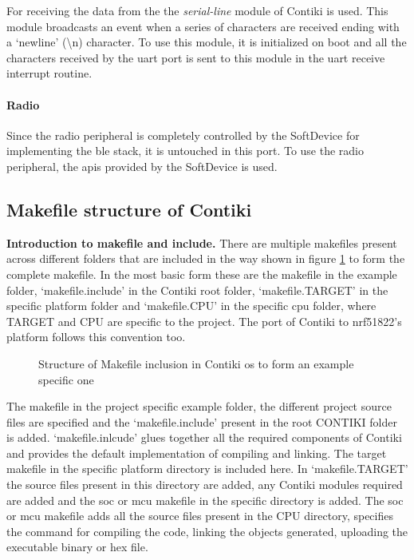 For receiving the data from the the \emph{serial-line} module of Contiki is used. This module broadcasts an event when a series of characters are received ending with a `newline' (\textbackslash n) character. To use this module, it is initialized on boot and all the characters received by the \gls{uart} port is sent to this module in the \gls{uart} receive interrupt routine.

\paragraph{Radio}
Since the radio peripheral is completely controlled by the SoftDevice for implementing the \gls{ble} stack, it is untouched in this port. To use the radio peripheral, the \glspl{api} provided by the SoftDevice is used.

\subsection{Makefile structure of Contiki}

\textbf{Introduction to makefile and include.}
There are multiple makefiles present across different folders that are included in the way shown in figure \ref{MakefileLevel} to form the complete makefile. In the most basic form these are the makefile in the example folder, `makefile.include' in the Contiki root folder, `makefile.TARGET' in the specific platform folder and `makefile.CPU' in the specific cpu folder, where TARGET and CPU are specific to the project. The port of Contiki to nrf51822's platform follows this convention too.

\begin{figure}[h]
\centering
\def\svgwidth{0.93\columnwidth}

\vspace{-10pt}
\caption{Structure of Makefile inclusion in Contiki \gls{os} to form an example specific one}
\label{MakefileLevel}
\end{figure}


The makefile in the project specific example folder, the different project source files are specified and the `makefile.include' present in the root CONTIKI folder is added. `makefile.inlcude' glues together all the required components of Contiki and provides the default implementation of compiling and linking. The target makefile in the specific platform directory is included here. In `makefile.TARGET' the source files present in this directory are added, any Contiki modules required are added and the \gls{soc} or \gls{mcu} makefile in the specific directory is added. The \gls{soc} or \gls{mcu} makefile adds all the source files present in the CPU directory, specifies the command for compiling the code, linking the objects generated, uploading the executable binary or hex file.

